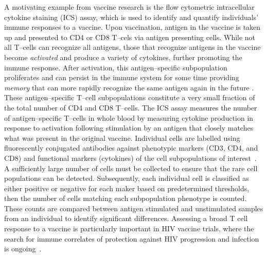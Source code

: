 \documentclass[11pt]{article}
\begin{document}
A motivating example from vaccine research is the flow cytometric intracellular cytokine staining (ICS) assay, which is used to identify and quantify individuals' immune responses to a vaccine. Upon vaccination, antigen in the vaccine is taken up and presented to CD4 or CD8 T--cels via antigen presenting cells. While not all T--cells can recognize all antigens, those that recognize antigens in the vaccine become \emph{activated} and produce a variety of cytokines, further promoting the immune response. After activation, this antigen--specific subpopulation proliferates and can persist in the immune system for some time providing \emph{memory} that can more rapidly recognize the same antigen again in the future \cite{McKinstry:2010ei}. These antigen--specific T--cell subpopulations constitute a very small fraction of the total number of CD4 and CD8 T--cells. The ICS assay measures the number of antigen--specific T--cells in whole blood by measuring cytokine production in response to activation following stimulation by an antigen that closely matches what was present in the original vaccine. Individual cells are labelled using fluorescently conjugated antibodies against phenotypic markers (CD3, CD4, and CD8) and functional markers (cytokines) of the cell subpopulations of interest~\cite{Horton:2007tsa,DeRosa:2004wp,Betts:2006dw}. A sufficiently large number of cells must be collected to ensure that the rare cell populations can be detected. Subsequently, each individual cell is classified as either positive or negative for each maker based on predetermined thresholds, then the number of cells matching each subpopulation phenotype is counted. These counts are compared between antigen stimulated and unstimulated samples from an individual to identify significant differences. Assessing a broad T cell response to a vaccine is particularly important in HIV vaccine trials, where the search for immune correlates of protection against HIV progression and infection is ongoing~\cite{Plotkin:2010ve,Horton:2007tsa,Kim:2010fw, Bendall:2011wf}.

\end{document}
